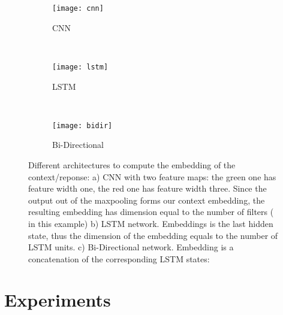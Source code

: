 \documentclass{article} \usepackage{nips15submit_e,times}
\begin{document}
\begin{figure}
    \centering
    \begin{subfigure}[b]{0.35\textwidth}
        \texttt{[image: cnn]}
        \caption{CNN}
        \label{fig:cnn}
    \end{subfigure}
    ~ \quad \begin{subfigure}[b]{0.2\textwidth}
        \texttt{[image: lstm]}
        \caption{LSTM}
        \label{fig:lstm}
    \end{subfigure}
    ~ \quad \begin{subfigure}[b]{0.2\textwidth}
        \texttt{[image: bidir]}
        \caption{Bi-Directional}
        \label{fig:bidirect}
    \end{subfigure}
    \caption{
    Different architectures to compute the embedding of the context/reponse:
    a) CNN with two feature maps: the green one has feature width one, the red one has feature width three.
        Since the output out of the maxpooling forms our context embedding, the resulting embedding has dimension equal to the number of filters ( in this example)
    b) LSTM network. Embeddings is the last hidden state, thus the dimension of the embedding equals to the number of LSTM units.
    c) Bi-Directional network. Embedding is a concatenation of the corresponding LSTM states: 
    }
    \label{fig:animals}
\end{figure}



\section{Experiments}
\end{document}
